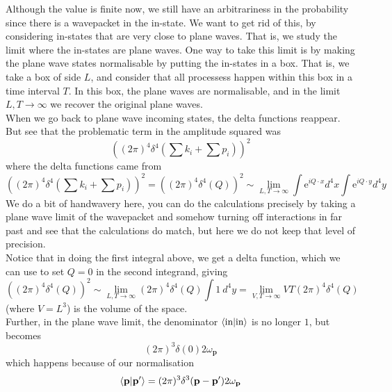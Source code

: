 \documentclass[11pt, notitlepage]{report}
\newcommand{\e}{\mathrm{e}}
\newcommand{\w}{\omega}
\numberwithin{equation}{section}
\begin{document}
    Although the value is finite now, we still have an arbitrariness in the probability since there is a wavepacket in the in-state. We want to get rid of this, by considering in-states that are very close to plane waves. That is, we study the limit where the in-states are plane waves. One way to take this limit is by making the plane wave states normalisable by putting the in-states in a box. That is, we take a box of side \(L\), and consider that all processess happen within this box in a time interval \(T\). In this box, the plane waves are normalisable, and in the limit \(L,T\to\infty\) we recover the original plane waves. \\

    When we go back to plane wave incoming states, the delta functions reappear. But see that the problematic term in the amplitude squared was 
    \begin{equation*}
        \left((2\pi)^4 \delta^4(\sum k_i + \sum p_i)\right)^2 
    \end{equation*}
    where the delta functions came from 
    \begin{equation*}
        \left((2\pi)^4 \delta^4(\sum k_i + \sum p_i)\right)^2 = \left((2\pi)^4 \delta^4(Q)\right)^2\sim  \lim_{L,T\to \infty}\int \e^{iQ\cdot x} d^4x \int \e^{iQ\cdot y}d^4y
    \end{equation*}
    We do a bit of handwavery here, you can do the calculations precisely by taking a plane wave limit of the wavepacket and somehow turning off interactions in far past and see that the calculations do match, but here we do not keep that level of precision. \\
    Notice that in doing the first integral above, we get a delta function, which we can use to set \(Q=0\) in the second integrand, giving
    \begin{equation*}
        \left((2\pi)^4 \delta^4(Q)\right)^2\sim  \lim_{L,T\to \infty}(2\pi)^4 \delta^4(Q) \int 1~d^4y = \lim_{V,T\to \infty}VT (2\pi)^4 \delta^4(Q) 
    \end{equation*}
    (where \(V=L^3\)) is the volume of the space.\\
    Further, in the plane wave limit, the denominator \(\braket{\text{in}|\text{in}}\) is no longer \(1\), but becomes 
    \begin{equation*}
        (2\pi)^3\delta(0)2\w_\textbf{p}
    \end{equation*}
    which happens because of our normalisation 
    \begin{equation*}
        \braket{\textbf{p}|\textbf{p}'} = (2\pi)^3 \delta^3(\textbf{p} - \textbf{p}')2\w_\textbf{p}
    \end{equation*}
\end{document}
